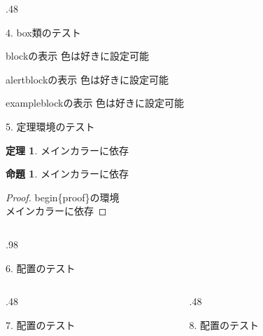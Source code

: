 \documentclass[dvipdfmx,10pt,notheor]{beamer}
\theoremstyle{definition}
\numberwithin{equation}{section}      %
\newtheorem{thm}[dfn]{定理}
\newtheorem{prop}[dfn]{命題}
\begin{document}
\begin{frame}{}
\begin{columns}[T]
\begin{column}{.48\linewidth}
\begin{mybox}{4. box類のテスト}
    \begin{block}{blockの表示}
        色は好きに設定可能
    \end{block}
    \begin{alertblock}{alertblockの表示}
        色は好きに設定可能
    \end{alertblock}
    \begin{exampleblock}{exampleblockの表示}
        色は好きに設定可能
    \end{exampleblock}
\end{mybox}
\vfill
\begin{mybox}{5. 定理環境のテスト}
    \begin{thm}
        メインカラーに依存
    \end{thm}
    \begin{prop}
        メインカラーに依存
    \end{prop}
    \begin{proof}
        begin\{proof\}の環境\\
        メインカラーに依存
    \end{proof}
\end{mybox}
\end{column}
\end{columns}


\vfill


\begin{columns}[T]
\begin{column}{.98\linewidth}
\begin{mybox}{6. 配置のテスト}
    
\end{mybox}
\end{column}
\end{columns}




\begin{columns}[T]
\begin{column}{.48\linewidth}
\begin{mybox}{7. 配置のテスト}
\end{mybox}
\end{column}
\begin{column}{.48\linewidth}
\begin{mybox}{8. 配置のテスト}
\end{mybox}
\end{column}
\end{columns}



\end{frame}
\end{document}
